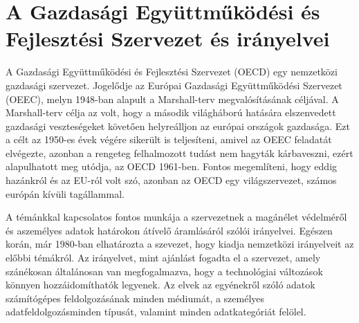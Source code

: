 \section{A Gazdasági Együttműködési és Fejlesztési Szervezet és irányelvei}

A Gazdasági Együttműködési és Fejlesztési Szervezet (OECD) egy nemzetközi gazdasági szervezet. Jogelődje az Európai Gazdasági Együttműködési Szervezet (OEEC), melyn 1948-ban alapult a Marshall-terv megvalósításának céljával. A Marshall-terv célja az volt, hogy a második világháború hatására elszenvedett gazdasági veszteségeket követően helyreálljon az európai országok gazdasága. Ezt a célt az 1950-es évek végére sikerült is teljesíteni, amivel az OEEC feladatát elvégezte, azonban a rengeteg felhalmozott tudást nem hagyták kárbaveszni, ezért alapulhatott meg utódja, az OECD 1961-ben. Fontos megemlíteni, hogy eddig hazánkról és az EU-ról volt szó, azonban az OECD egy világszervezet, számos európán kívüli tagállammal.

A témánkkal kapcsolatos fontos munkája a szervezetnek a magánélet védelméről és aszemélyes adatok határokon átívelő áramlásáról szólói irányelvei. Egészen korán, már 1980-ban elhatározta a szevezet, hogy kiadja nemzetközi irányelveit az előbbi témákról. Az irányelvet, mint ajánlást fogadta el a szervezet, amely szánékosan általánosan van megfogalmazva, hogy a technológiai változások könnyen hozzáidomíthatók legyenek. Az elvek az egyénekről szóló adatok számítógépes feldolgozásának minden médiumát, a személyes adatfeldolgozásminden típusát, valamint minden adatkategóriát felölel.

